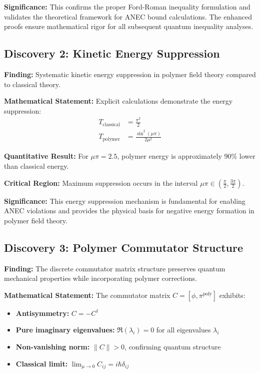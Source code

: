 \documentclass[11pt]{article}
\begin{document}
\textbf{Significance:} This confirms the proper Ford-Roman inequality formulation and validates the theoretical framework for ANEC bound calculations. The enhanced proofs ensure mathematical rigor for all subsequent quantum inequality analyses.

\subsection{Discovery 2: Kinetic Energy Suppression}

\textbf{Finding:} Systematic kinetic energy suppression in polymer field theory compared to classical theory.

\textbf{Mathematical Statement:}
Explicit calculations demonstrate the energy suppression:
\begin{align}
T_{\text{classical}} &= \frac{\pi^2}{2} \\
T_{\text{polymer}} &= \frac{\sin^2(\mu\pi)}{2\mu^2}
\end{align}

\textbf{Quantitative Result:} For $\mu\pi = 2.5$, polymer energy is approximately 90\% lower than classical energy.

\textbf{Critical Region:} Maximum suppression occurs in the interval $\mu\pi \in \left(\frac{\pi}{2}, \frac{3\pi}{2}\right)$.

\textbf{Significance:} This energy suppression mechanism is fundamental for enabling ANEC violations and provides the physical basis for negative energy formation in polymer field theory.

\subsection{Discovery 3: Polymer Commutator Structure}

\textbf{Finding:} The discrete commutator matrix structure preserves quantum mechanical properties while incorporating polymer corrections.

\textbf{Mathematical Statement:}
The commutator matrix $C = [\phi, \pi^{\text{poly}}]$ exhibits:
\begin{itemize}
    \item \textbf{Antisymmetry:} $C = -C^\dagger$
    \item \textbf{Pure imaginary eigenvalues:} $\Re(\lambda_i) = 0$ for all eigenvalues $\lambda_i$
    \item \textbf{Non-vanishing norm:} $\|C\| > 0$, confirming quantum structure
    \item \textbf{Classical limit:} $\lim_{\mu \to 0} C_{ij} = i\hbar\delta_{ij}$
\end{itemize}
\end{document}
